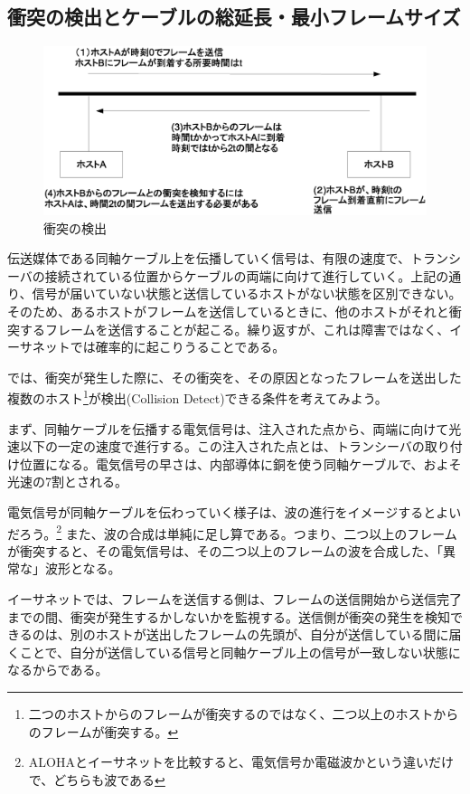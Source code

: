 \subsection{衝突の検出とケーブルの総延長・最小フレームサイズ}

\begin{figure}[htbp]
	\includegraphics[width=12cm,clip]{draw/colision.eps}
	\caption{衝突の検出}
	\label{fig:colision}
\end{figure}


伝送媒体である同軸ケーブル上を伝播していく信号は、有限の速度で、トランシーバの接続されている位置からケーブルの両端に向けて進行していく。上記の通り、信号が届いていない状態と送信しているホストがない状態を区別できない。そのため、あるホストがフレームを送信しているときに、他のホストがそれと衝突するフレームを送信することが起こる。繰り返すが、これは障害ではなく、イーサネットでは確率的に起こりうることである。

では、衝突が発生した際に、その衝突を、その原因となったフレームを送出した複数のホスト\footnote{二つのホストからのフレームが衝突するのではなく、二つ以上のホストからのフレームが衝突する。}が検出(Collision Detect)できる条件を考えてみよう。

まず、同軸ケーブルを伝播する電気信号は、注入された点から、両端に向けて光速以下の一定の速度で進行する。この注入された点とは、トランシーバの取り付け位置になる。電気信号の早さは、内部導体に銅を使う同軸ケーブルで、およそ光速の7割とされる。

電気信号が同軸ケーブルを伝わっていく様子は、波の進行をイメージするとよいだろう。\footnote{ALOHAとイーサネットを比較すると、電気信号か電磁波かという違いだけで、どちらも波である} また、波の合成は単純に足し算である。つまり、二つ以上のフレームが衝突すると、その電気信号は、その二つ以上のフレームの波を合成した、「異常な」波形となる。

イーサネットでは、フレームを送信する側は、フレームの送信開始から送信完了までの間、衝突が発生するかしないかを監視する。送信側が衝突の発生を検知できるのは、別のホストが送出したフレームの先頭が、自分が送信している間に届くことで、自分が送信している信号と同軸ケーブル上の信号が一致しない状態になるからである。

